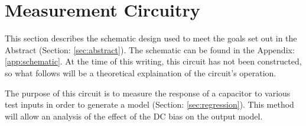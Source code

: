 \section {Measurement Circuitry}
\label{sec:measCirc}
This section describes the schematic design used to meet the goals set out in the Abstract (Section: \ref{sec:abstract}). The schematic can be found in the Appendix: \ref{app:schematic}. At the time of this writing, this circuit has not been constructed, so what follows will be a theoretical explaination of the circuit's operation.

The purpose of this circuit is to measure the response of a capacitor to various test inputs in order to generate a model (Section: \ref{sec:regression}). This method will allow an analysis of the effect of the DC bias on the output model.

\nocite{my_ieeePaper}













